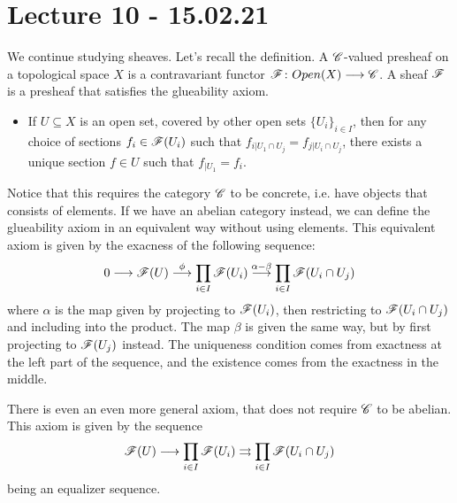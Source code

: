 
\section{Lecture 10 - 15.02.21}

We continue studying sheaves. Let's recall the definition. A $\mathscr{C}$-valued presheaf on a topological space $X$ is a contravariant functor $\mathscr{F}\colon Open(X)\longrightarrow \mathscr{C}$. A sheaf $\mathscr{F}$ is a presheaf that satisfies the glueability axiom. 

\begin{itemize}
    \item If $U\subseteq X$ is an open set, covered by other open sets $\{U_i\}_{i\in I}$, then for any choice of sections $f_i\in \mathscr{F}(U_i)$ such that $f_{i\vert U_1\cap U_j} = f_{j\vert U_i\cap U_j}$, there exists a unique section $f\in U$ such that $f_{\vert U_1} = f_i$. 
\end{itemize}

Notice that this requires the category $\mathscr{C}$ to be concrete, i.e. have objects that consists of elements. If we have an abelian category instead, we can define the glueability axiom in an equivalent way without using elements. This equivalent axiom is given by the exacness of the following sequence:
\begin{equation*}
    0\longrightarrow \mathscr{F}(U)\overset{\phi}\longrightarrow \prod_{i\in I} \mathscr{F}(U_i)\overset{\alpha - \beta}\longrightarrow \prod_{i\in I} \mathscr{F}(U_i\cap U_j)
\end{equation*}
where $\alpha$ is the map given by projecting to $\mathscr{F}(U_i)$, then restricting to $\mathscr{F}(U_i\cap U_j)$ and including into the product. The map $\beta$ is given the same way, but by first projecting to $\mathscr{F}(U_j)$ instead. The uniqueness condition comes from exactness at the left part of the sequence, and the existence comes from the exactness in the middle.

There is even an even more general axiom, that does not require $\mathscr{C}$ to be abelian. This axiom is given by the sequence
\begin{equation*}
    \mathscr{F}(U)\longrightarrow \prod_{i\in I} \mathscr{F}(U_i)\rightrightarrows \prod_{i\in I} \mathscr{F}(U_i\cap U_j)
\end{equation*}
being an equalizer sequence. 

